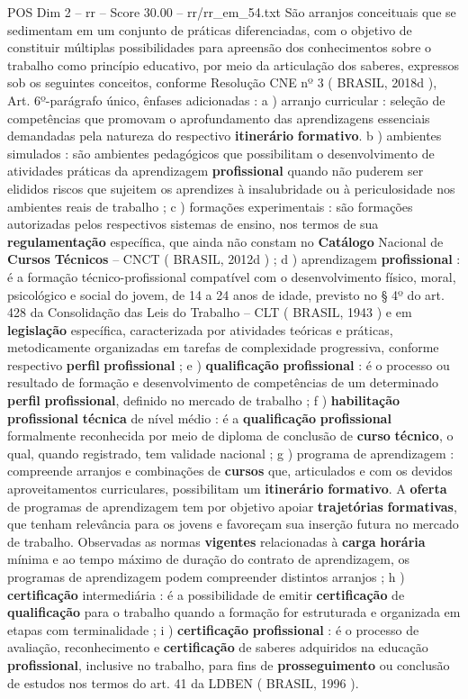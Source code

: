 \begin{textsample}{POS Dim 2 – rr – Score 30.00 – rr/rr\_em\_54.txt}
São arranjos conceituais que se sedimentam em um conjunto de práticas diferenciadas, com o objetivo de constituir múltiplas possibilidades para apreensão dos conhecimentos sobre o trabalho como princípio educativo, por meio da articulação dos saberes, expressos sob os seguintes conceitos, conforme Resolução CNE nº 3 ( BRASIL, 2018d ), Art. 6º-parágrafo único, ênfases adicionadas : a ) arranjo curricular : seleção de competências que promovam o aprofundamento das aprendizagens essenciais demandadas pela natureza do respectivo \textbf{itinerário} \textbf{formativo}. b ) ambientes simulados : são ambientes pedagógicos que possibilitam o desenvolvimento de atividades práticas da aprendizagem \textbf{profissional} quando não puderem ser elididos riscos que sujeitem os aprendizes à insalubridade ou à periculosidade nos ambientes reais de trabalho ; c ) formações experimentais : são formações autorizadas pelos respectivos sistemas de ensino, nos termos de sua \textbf{regulamentação} específica, que ainda não constam no \textbf{Catálogo} Nacional de \textbf{Cursos} \textbf{Técnicos} – CNCT ( BRASIL, 2012d ) ; d ) aprendizagem \textbf{profissional} : é a formação técnico-profissional compatível com o desenvolvimento físico, moral, psicológico e social do jovem, de 14 a 24 anos de idade, previsto no § 4º do art. 428 da Consolidação das Leis do Trabalho – CLT ( BRASIL, 1943 ) e em \textbf{legislação} específica, caracterizada por atividades teóricas e práticas, metodicamente organizadas em tarefas de complexidade progressiva, conforme respectivo \textbf{perfil} \textbf{profissional} ; e ) \textbf{qualificação} \textbf{profissional} : é o processo ou resultado de formação e desenvolvimento de competências de um determinado \textbf{perfil} \textbf{profissional}, definido no mercado de trabalho ; f ) \textbf{habilitação} \textbf{profissional} \textbf{técnica} de nível médio : é a \textbf{qualificação} \textbf{profissional} formalmente reconhecida por meio de diploma de conclusão de \textbf{curso} \textbf{técnico}, o qual, quando registrado, tem validade nacional ; g ) programa de aprendizagem : compreende arranjos e combinações de \textbf{cursos} que, articulados e com os devidos aproveitamentos curriculares, possibilitam um \textbf{itinerário} \textbf{formativo}.
A \textbf{oferta} de programas de aprendizagem tem por objetivo apoiar \textbf{trajetórias} \textbf{formativas}, que tenham relevância para os jovens e favoreçam sua inserção futura no mercado de trabalho.
Observadas as normas \textbf{vigentes} relacionadas à \textbf{carga} \textbf{horária} mínima e ao tempo máximo de duração do contrato de aprendizagem, os programas de aprendizagem podem compreender distintos arranjos ; h ) \textbf{certificação} intermediária : é a possibilidade de emitir \textbf{certificação} de \textbf{qualificação} para o trabalho quando a formação for estruturada e organizada em etapas com terminalidade ; i ) \textbf{certificação} \textbf{profissional} : é o processo de avaliação, reconhecimento e \textbf{certificação} de saberes adquiridos na educação \textbf{profissional}, inclusive no trabalho, para fins de \textbf{prosseguimento} ou conclusão de estudos nos termos do art. 41 da LDBEN ( BRASIL, 1996 ).

\end{textsample}
